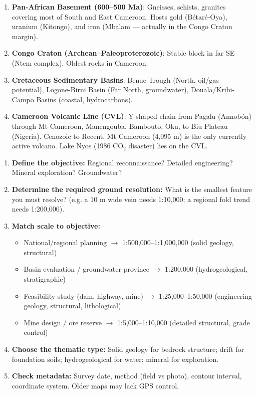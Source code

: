 \documentclass[11pt]{article}
\newcounter{popsec}
\newcounter{popsub}
\newcommand{\courssub}[1]{%
  \stepcounter{popsub}%
  \par\vspace{9pt}\noindent{\popxbold\fontsize{11.5}{13}\selectfont\color{popink}{\color{poporange}\thepopsec.\thepopsub}\hspace{6pt}#1}\par\nopagebreak\vspace{4pt}
}
\begin{document}
\begin{savaistu}
\begin{enumerate}
\item \textbf{Pan-African Basement (600–500 Ma)}: Gneisses, schists, granites covering most of South and East Cameroon. Hosts gold (Bétaré-Oya), uranium (Kitongo), and iron (Mbalam — actually in the Congo Craton margin).
\item \textbf{Congo Craton (Archean–Paleoproterozoic)}: Stable block in far SE (Ntem complex). Oldest rocks in Cameroon.
\item \textbf{Cretaceous Sedimentary Basins}: Benue Trough (North, oil/gas potential), Logone-Birni Basin (Far North, groundwater), Douala/Kribi-Campo Basins (coastal, hydrocarbons).
\item \textbf{Cameroon Volcanic Line (CVL)}: Y-shaped chain from Pagalu (Annobón) through Mt Cameroon, Manengouba, Bambouto, Oku, to Biu Plateau (Nigeria). Cenozoic to Recent. Mt Cameroon (4,095 m) is the only currently active volcano. Lake Nyos (1986 CO$_2$ disaster) lies on the CVL.
\end{enumerate}
\end{savaistu}

\courssub{Choosing the Right Map for the Job}

\begin{methode}
\begin{enumerate}
\item \textbf{Define the objective:} Regional reconnaissance? Detailed engineering? Mineral exploration? Groundwater?
\item \textbf{Determine the required ground resolution:} What is the smallest feature you must resolve? (e.g. a 10 m wide vein needs 1:10,000; a regional fold trend needs 1:200,000).
\item \textbf{Match scale to objective:}
\begin{itemize}
\item National/regional planning $\rightarrow$ 1:500,000–1:1,000,000 (solid geology, structural)
\item Basin evaluation / groundwater province $\rightarrow$ 1:200,000 (hydrogeological, stratigraphic)
\item Feasibility study (dam, highway, mine) $\rightarrow$ 1:25,000–1:50,000 (engineering geology, structural, lithological)
\item Mine design / ore reserve $\rightarrow$ 1:5,000–1:10,000 (detailed structural, grade control)
\end{itemize}
\item \textbf{Choose the thematic type:} Solid geology for bedrock structure; drift for foundation soils; hydrogeological for water; mineral for exploration.
\item \textbf{Check metadata:} Survey date, method (field vs photo), contour interval, coordinate system. Older maps may lack GPS control.
\end{enumerate}
\end{methode}
\end{document}

